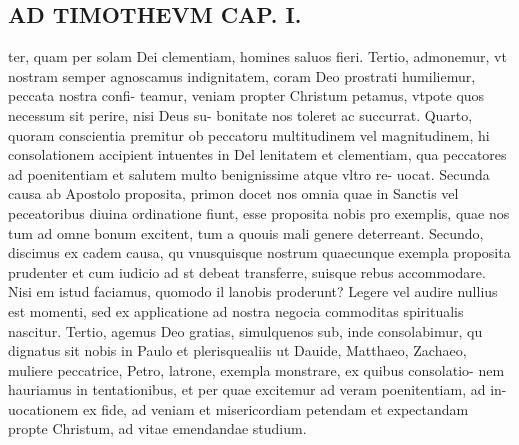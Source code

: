 \documentclass{article}
\begin{document}
\begin{pages}
\section*{AD TIMOTHEVM CAP. I. }
\marginpar{[ p.57 ]}\pstart ter, quam per solam Dei clementiam, homines saluos fieri. Tertio, admonemur, vt nostram semper agnoscamus indignitatem, coram Deo prostrati humiliemur, peccata nostra confi- teamur, veniam propter Christum petamus, vtpote quos necessum sit perire, nisi Deus su- bonitate nos toleret ac succurrat. Quarto, quoram conscientia premitur ob peccatoru multitudinem vel magnitudinem, hi consolationem accipient intuentes in Del lenitatem et clementiam, qua peccatores ad poenitentiam et salutem multo benignissime atque  vltro re- uocat. Secunda causa ab Apostolo proposita, primon docet nos omnia quae in Sanctis vel peceatoribus diuina ordinatione fiunt, esse proposita nobis pro exemplis, quae nos tum ad omne bonum excitent, tum a quouis mali genere deterreant. Secundo, discimus ex cadem causa, qu vnusquisque  nostrum quaecunque  exempla proposita prudenter et cum iudicio ad st debeat transferre, suisque  rebus accommodare. Nisi em istud faciamus, quomodo il lanobis proderunt? Legere vel audire nullius est momenti, sed ex applicatione ad nostra negocia commoditas spiritualis nascitur. Tertio, agemus Deo gratias, simulquenos sub, inde consolabimur, qu dignatus sit nobis in Paulo et plerisquealiis ut Dauide, Matthaeo, Zachaeo, muliere peccatrice, Petro, latrone, exempla monstrare, ex quibus consolatio- nem hauriamus in tentationibus, et per quae excitemur ad veram poenitentiam, ad in- uocationem ex fide, ad veniam et misericordiam petendam et expectandam propte Christum, ad vitae emendandae studium.  \pend
{}
{}

\end{pages}
\end{document}
